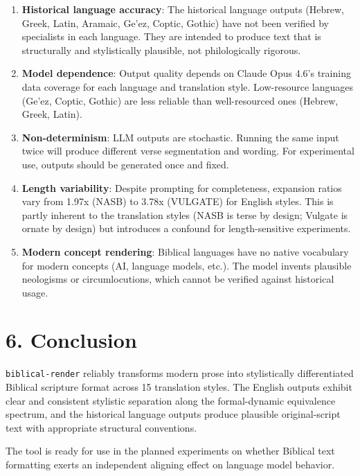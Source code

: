 \documentclass[10pt, letterpaper, twocolumn]{article}
\begin{document}
\begin{enumerate}
\def\labelenumi{\arabic{enumi}.}
\item
  \textbf{Historical language accuracy}: The historical language outputs (Hebrew, Greek, Latin, Aramaic, Ge'ez, Coptic, Gothic) have not been verified by specialists in each language. They are intended to produce text that is structurally and stylistically plausible, not philologically rigorous.
\item
  \textbf{Model dependence}: Output quality depends on Claude Opus 4.6's training data coverage for each language and translation style. Low-resource languages (Ge'ez, Coptic, Gothic) are less reliable than well-resourced ones (Hebrew, Greek, Latin).
\item
  \textbf{Non-determinism}: LLM outputs are stochastic. Running the same input twice will produce different verse segmentation and wording. For experimental use, outputs should be generated once and fixed.
\item
  \textbf{Length variability}: Despite prompting for completeness, expansion ratios vary from 1.97x (NASB) to 3.78x (VULGATE) for English styles. This is partly inherent to the translation styles (NASB is terse by design; Vulgate is ornate by design) but introduces a confound for length-sensitive experiments.
\item
  \textbf{Modern concept rendering}: Biblical languages have no native vocabulary for modern concepts (AI, language models, etc.). The model invents plausible neologisms or circumlocutions, which cannot be verified against historical usage.
\end{enumerate}

\section*{6. Conclusion}\label{conclusion}

\texttt{biblical-render} reliably transforms modern prose into stylistically differentiated Biblical scripture format across 15 translation styles. The English outputs exhibit clear and consistent stylistic separation along the formal-dynamic equivalence spectrum, and the historical language outputs produce plausible original-script text with appropriate structural conventions.

The tool is ready for use in the planned experiments on whether Biblical text formatting exerts an independent aligning effect on language model behavior.
\end{document}

